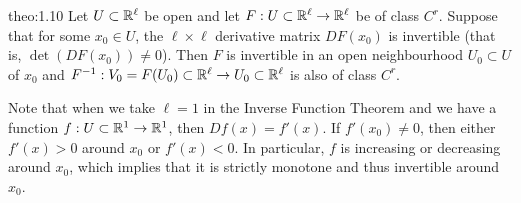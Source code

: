 \begin{theo}{theo:1.10}
    Let $U \subset \mathbb{R}^\ell$ be open and let $F : U \subset \mathbb{R}^\ell \to \mathbb{R}^\ell$ 
    be of class $C^r$. Suppose that for some $x_0 \in U$, the $\ell \times \ell$ 
    derivative matrix $DF(x_0)$ is invertible (that is, $\det(DF(x_0)) \neq 0$). 
    Then $F$ is invertible in an open neighbourhood $U_0 \subset U$ of $x_0$ and 
    $F^{-1} : V_0 = F(U_0) \subset \mathbb{R}^\ell \to U_0 \subset \mathbb{R}^\ell$ 
    is also of class $C^r$.
\end{theo}\vspace{-0.25cm}

Note that when we take $\ell = 1$ in the Inverse Function Theorem 
and we have a function $f : U \subset \mathbb{R}^1 \to \mathbb{R}^1$, then $Df(x) = f'(x)$. 
If $f'(x_0) \neq 0$, then either $f'(x) > 0$ around $x_0$ or $f'(x) < 0$. 
In particular, $f$ is increasing or decreasing around $x_0$, which implies 
that it is strictly monotone and thus invertible around $x_0$. 

